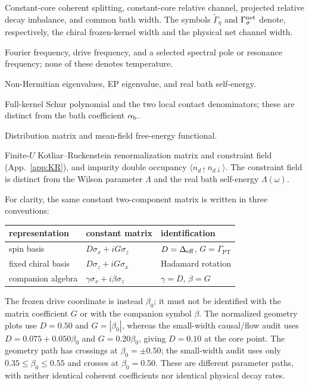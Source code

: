 \documentclass[%
  aps,physrev,onecolumn,10pt,amsmath,amssymb,superscriptaddress,longbibliography,floatfix
]{revtex4-2}
\newcommand{\Gpt}{\Gamma_{\mathrm{PT}}}   %
\newcommand{\Deff}{\Delta_{\rm eff}}     %
\begin{document}
\begin{description}[leftmargin=1.6cm,style=nextline]
\item[$D,G,\Gamma_{\rm PT},\bar\Gamma$]
Constant-core coherent splitting, constant-core relative channel, projected
relative decay imbalance, and common bath width.  The symbols
$\tilde\Gamma_\eta$ and $\Gamma_\sigma^{\rm net}$ denote, respectively, the
chiral frozen-kernel width and the physical net channel width.
\item[$\omega,\Omega,\omega_0$]
Fourier frequency, drive frequency, and a selected spectral pole or resonance frequency; none of these denotes temperature.
\item[$\mathcal E_n,E_{\rm EP},\Lambda(\omega)$]
Non-Hermitian eigenvalues, EP eigenvalue, and real bath self-energy.
\item[$\mathcal P,\mathfrak a,\mathfrak b$]
Full-kernel Schur polynomial and the two local contact denominators; these are distinct from the bath coefficient $\alpha_{\rm b}$.
\item[$\mathcal F_{\rm dist},\mathcal F_{\rm MF}$]
Distribution matrix and mean-field free-energy functional.
\item[$R,\Lambda_f,D_d$]
Finite-$U$ Kotliar--Ruckenstein renormalization matrix and constraint field
(App.~\ref{app:KR}), and impurity double occupancy
$\langle n_{d\uparrow}n_{d\downarrow}\rangle$.  The constraint field is distinct
from the Wilson parameter $\Lambda$ and the real bath self-energy $\Lambda(\omega)$.
\end{description}

For clarity, the same constant two-component matrix is written in three
conventions:
\begin{center}
\begin{tabular}{@{}lll@{}}
\toprule
representation & constant matrix & identification \\
\midrule
spin basis & $D\sigma_x+iG\sigma_z$ & $D=\Deff$, $G=\Gpt$ \\
fixed chiral basis & $D\sigma_z+iG\sigma_x$ & Hadamard rotation \\
companion algebra & $\gamma\sigma_x+i\beta\sigma_z$ & $\gamma=D$, $\beta=G$ \\
\bottomrule
\end{tabular}
\end{center}
The frozen drive coordinate is instead $\beta_0$; it must not be identified
with the matrix coefficient $G$ or with the companion symbol $\beta$.
The normalized geometry plots use $D=0.50$ and $G=|\beta_0|$, whereas the
small-width causal/flow audit uses $D=0.075+0.050\beta_0$ and
$G=0.20\beta_0$, giving $D=0.10$ at the core point.  The geometry path has crossings at $\beta_0=\pm0.50$;
the small-width audit uses only $0.35\leq\beta_0\leq0.55$ and crosses
at $\beta_0=0.50$.  These are different parameter paths, with neither
identical coherent coefficients nor identical physical decay rates.
\end{document}
